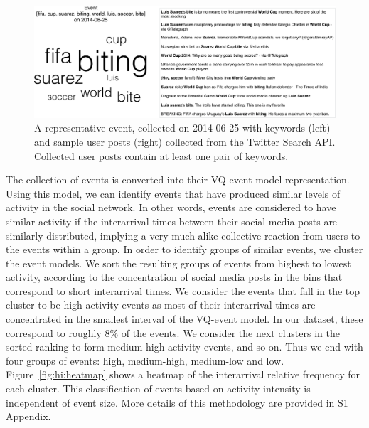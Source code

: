 \begin{figure}
  \includegraphics[width=\textwidth]{figures/high-activity/fig2}
  \caption[Example event]{A representative event, collected on 2014-06-25 with
      keywords (left) and sample user posts (right) collected from the Twitter
      Search API. Collected user posts contain at least one pair of keywords. }
  \label{fig:hi:components}
\end{figure}


The collection of events is converted into their VQ-event model representation. 
%
Using this model, we can identify events that have produced similar levels of
activity in the social network. 
%
In other words, events are considered to have similar activity if the
interarrival times between their social media posts are similarly distributed,
implying a very much alike collective reaction from users to the events within a
group. 
%
In order to identify groups of similar events, we cluster the event models. 
%
We sort the resulting groups of events from highest to lowest activity,
according to the concentration of social media posts in the bins that correspond
to short interarrival times. 
%
We consider the events that fall in the top cluster to be high-activity events
as most of their interarrival times are concentrated in the smallest interval of
the VQ-event model.
%
In our dataset, these correspond to roughly 8\% of the events. 
%
We consider the next clusters in the sorted ranking to form medium-high activity
events, and so on. 
%
Thus we end with four groups of events: high, medium-high, medium-low and low.
Figure~\ref{fig:hi:heatmap} shows a heatmap of the interarrival relative
frequency for each cluster. 
%
This classification of events based on activity intensity is independent of
event size. 
%
More details of this methodology are provided in S1 Appendix.


